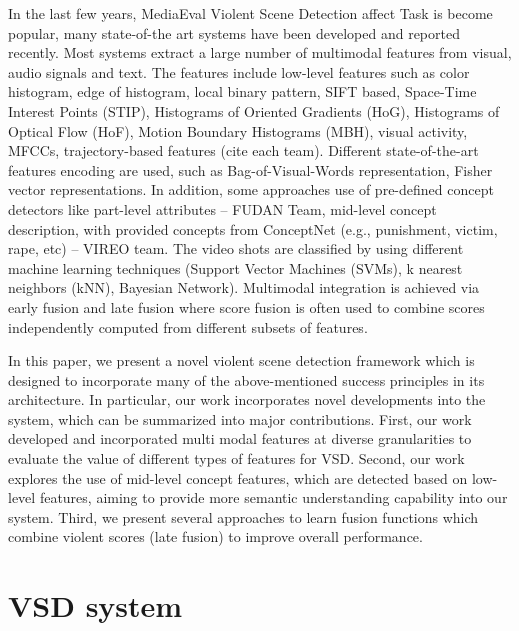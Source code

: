 \documentclass[review]{elsarticle}
\begin{document}
In the last few years, MediaEval Violent Scene Detection affect Task is become popular, many state-of-the art systems have been developed and reported recently\cite{demarty2014benchmarking}. Most systems extract a large number of multimodal features from visual, audio signals and text.  The features include low-level features such as color histogram, edge of histogram, local binary pattern, SIFT based, Space-Time Interest Points (STIP), Histograms of Oriented Gradients (HoG), Histograms of Optical Flow (HoF), Motion Boundary Histograms (MBH), visual activity, MFCCs, trajectory-based features  (cite each team). Different state-of-the-art features encoding are used, such as Bag-of-Visual-Words representation, Fisher vector representations. In addition, some approaches use of pre-defined concept detectors like part-level attributes – FUDAN Team\cite{dai2013fudan}, mid-level concept description, with provided concepts from ConceptNet (e.g., punishment, victim, rape, etc) – VIREO team\cite{tan2013vireo}. The video shots are classified by using different machine learning techniques (Support Vector Machines (SVMs), k nearest neighbors (kNN), Bayesian Network). Multimodal integration is achieved via early fusion\cite{penet2013technicolor}  and late fusion\cite{penet2013technicolor,sjoberg2013far,derbas2013lig,dai2013fudan} where score fusion is often used to combine scores independently computed from different subsets of features.

In this paper, we present a novel violent scene detection framework which is designed to incorporate many of the above-mentioned success principles in its architecture. In particular, our work incorporates novel developments into the system, which can be summarized into major contributions. First, our work developed and incorporated multi modal features at diverse granularities to evaluate the value of different types of features for VSD. Second, our work explores the use of mid-level concept features, which are detected based on low-level features, aiming to provide more semantic understanding capability into our system. Third,  we present several approaches to learn fusion functions which combine violent scores (late fusion) to improve overall performance.

\section{VSD system}
\end{document}
